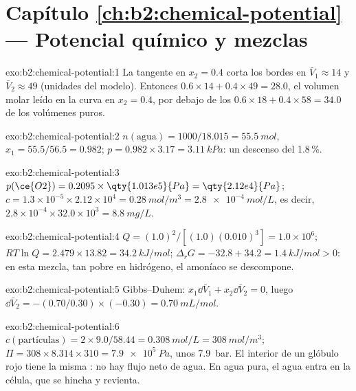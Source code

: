 \section*{Capítulo \ref{ch:b2:chemical-potential} --- Potencial químico y mezclas}

\begin{solution}{exo:b2:chemical-potential:1}
La tangente en $x_2 = 0.4$ corta los bordes en $\bar V_1 \approx 14$ y $\bar
V_2 \approx 49$ (unidades del modelo). Entonces $0.6 \times 14 + 0.4 \times 49 = 28.0$,
el volumen molar leído en la curva en $x_2 = 0.4$, por debajo de los
$0.6 \times 18 + 0.4 \times 58 = 34.0$ de los volúmenes puros.
\end{solution}

\begin{solution}{exo:b2:chemical-potential:2}
$n(\text{agua}) = 1000/18.015 = \qty{55.5}{mol}$, $x_1 = 55.5/56.5 = 0.982$;
$p = 0.982 \times 3.17 = \qty{3.11}{kPa}$: un descenso del 1.8\,\%.
\end{solution}

\begin{solution}{exo:b2:chemical-potential:3}
$p(\ce{O2}) = 0.2095 \times \qty{1.013e5}{Pa} = \qty{2.12e4}{Pa}$;
$c = 1.3 \times 10^{-5} \times 2.12 \times 10^4 = \qty{0.28}{mol/m^3} =
\qty{2.8e-4}{mol/L}$, es decir, $2.8 \times 10^{-4} \times 32.0 \times 10^3 =
\qty{8.8}{mg/L}$.
\end{solution}

\begin{solution}{exo:b2:chemical-potential:4}
$Q = (1.0)^2/[(1.0)(0.010)^3] = 1.0 \times 10^6$; $RT\ln Q = 2.479 \times 13.82 =
\qty{34.2}{kJ/mol}$; $\Delta_r G = -32.8 + 34.2 = \qty{+1.4}{kJ/mol} > 0$: en esta
mezcla, tan pobre en hidrógeno, el amoníaco se descompone.
\end{solution}

\begin{solution}{exo:b2:chemical-potential:5}
Gibbs--Duhem: $x_1\dd\bar V_1 + x_2\dd\bar V_2 = 0$, luego $\dd\bar V_2 =
-(0.70/0.30) \times (-0.30) = \qty{+0.70}{mL/mol}$.
\end{solution}

\begin{solution}{exo:b2:chemical-potential:6}
$c(\text{partículas}) = 2 \times 9.0/58.44 = \qty{0.308}{mol/L} =
\qty{308}{mol/m^3}$; $\Pi = 308 \times 8.314 \times 310 = \qty{7.9e5}{Pa}$,
unos \qty{7.9}{bar}. El interior de un glóbulo rojo tiene la misma :
no hay flujo neto de agua. En agua pura, el agua entra en la célula, que se hincha y
revienta.
\end{solution}

